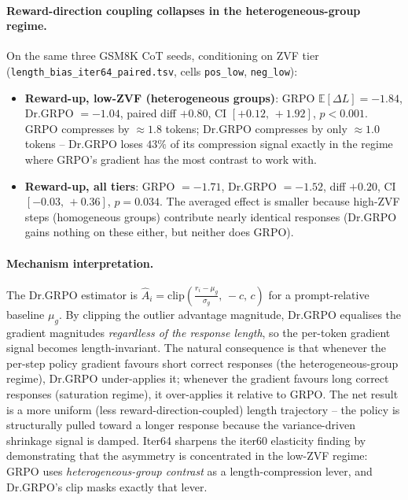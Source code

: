 \paragraph{Reward-direction coupling collapses in the heterogeneous-group regime.}
On the same three GSM8K CoT seeds, conditioning on ZVF tier
(\texttt{length\_bias\_iter64\_paired.tsv}, cells \texttt{pos\_low},
\texttt{neg\_low}):
\begin{itemize}
\item \textbf{Reward-up, low-ZVF (heterogeneous groups)}:
      GRPO $\mathbb{E}[\Delta L] = -1.84$, Dr.GRPO $= -1.04$,
      paired diff $+0.80$, CI $[+0.12,\, +1.92]$, $p < 0.001$.
      GRPO compresses by $\approx 1.8$ tokens; Dr.GRPO compresses by
      only $\approx 1.0$ tokens -- Dr.GRPO loses $43\%$ of its
      compression signal exactly in the regime where GRPO's gradient
      has the most contrast to work with.
\item \textbf{Reward-up, all tiers}:
      GRPO $= -1.71$, Dr.GRPO $= -1.52$, diff $+0.20$,
      CI $[-0.03,\, +0.36]$, $p = 0.034$. The averaged effect is
      smaller because high-ZVF steps (homogeneous groups) contribute
      nearly identical responses (Dr.GRPO gains nothing on these
      either, but neither does GRPO).
\end{itemize}

\paragraph{Mechanism interpretation.}
The Dr.GRPO estimator is $\hat A_i = \mathrm{clip}\!\left(\frac{r_i - \mu_g}{\sigma_g},\, -c,\, c\right)$
for a prompt-relative baseline $\mu_g$. By clipping the outlier
advantage magnitude, Dr.GRPO equalises the gradient magnitudes
\emph{regardless of the response length}, so the per-token gradient
signal becomes length-invariant. The natural consequence is that
whenever the per-step policy gradient favours short correct responses
(the heterogeneous-group regime), Dr.GRPO under-applies it; whenever
the gradient favours long correct responses (saturation regime), it
over-applies it relative to GRPO. The net result is a more uniform
(less reward-direction-coupled) length trajectory -- the policy is
structurally pulled toward a longer response because the variance-driven
shrinkage signal is damped. Iter64 sharpens the iter60 elasticity
finding by demonstrating that the asymmetry is concentrated in the
low-ZVF regime: GRPO uses \emph{heterogeneous-group contrast} as a
length-compression lever, and Dr.GRPO's clip masks exactly that lever.

